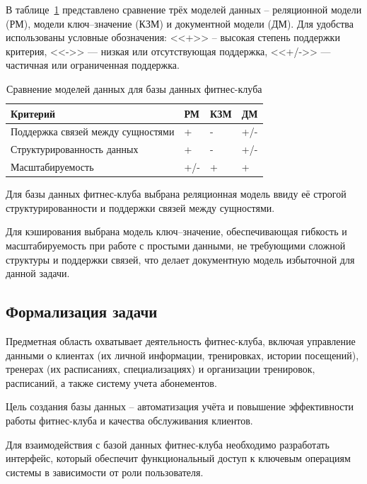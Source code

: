 В таблице~\ref{dif} представлено сравнение трёх моделей данных -- реляционной модели (РМ), модели ключ–значение (КЗМ) и документной модели (ДМ). Для удобства использованы условные обозначения: <<+>> -- высокая степень поддержки критерия, <<->> — низкая или отсутствующая поддержка, <<+/->> — частичная или ограниченная поддержка.

\begin{table}[h!]
	\centering
	\begin{tabular}{|p{5.2cm}|>{\centering\arraybackslash}p{2.3cm}|>{\centering\arraybackslash}p{2.3cm}|>{\centering\arraybackslash}p{2.3cm}|}
		\hline
		\textbf{Критерий} & \textbf{РМ} & \textbf{КЗМ} & \textbf{ДМ} \\
		\hline
		Поддержка связей между сущностями & + & - & +/- \\
		\hline
		Структурированность данных & + & - & +/- \\
		\hline
		Масштабируемость & +/- & + & + \\
		\hline
	\end{tabular}
	\caption{Сравнение моделей данных для базы данных фитнес-клуба}
	\label{dif}
\end{table}

Для базы данных фитнес-клуба выбрана реляционная модель ввиду её строгой структурированности и поддержки связей между сущностями.

Для кэширования выбрана модель ключ–значение, обеспечивающая гибкость и масштабируемость при работе с простыми данными, не требующими сложной структуры и поддержки связей, что делает документную модель избыточной для данной задачи.

\subsection{Формализация задачи}

Предметная область охватывает деятельность фитнес-клуба, включая управление данными о клиентах (их личной информации, тренировках, истории посещений), тренерах (их расписаниях, специализациях) и организации тренировок, расписаний, а также систему учета абонементов. 

Цель создания базы данных -- автоматизация учёта и повышение эффективности работы фитнес-клуба и качества обслуживания клиентов.

Для взаимодействия с базой данных фитнес-клуба необходимо разработать интерфейс, который обеспечит функциональный доступ к ключевым операциям системы в зависимости от роли пользователя.

